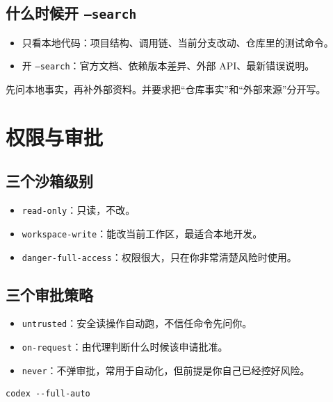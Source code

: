 \documentclass[UTF8,a4paper,11pt]{ctexart}
\begin{document}
\subsection{什么时候开 \texttt{--search}}

\begin{itemize}
  \item 只看本地代码：项目结构、调用链、当前分支改动、仓库里的测试命令。
  \item 开 \texttt{--search}：官方文档、依赖版本差异、外部 API、最新错误说明。
\end{itemize}

\begin{tipbox}
先问本地事实，再补外部资料。并要求把“仓库事实”和“外部来源”分开写。
\end{tipbox}

\section{权限与审批}

\subsection{三个沙箱级别}

\begin{itemize}
  \item \texttt{read-only}：只读，不改。
  \item \texttt{workspace-write}：能改当前工作区，最适合本地开发。
  \item \texttt{danger-full-access}：权限很大，只在你非常清楚风险时使用。
\end{itemize}

\subsection{三个审批策略}

\begin{itemize}
  \item \texttt{untrusted}：安全读操作自动跑，不信任命令先问你。
  \item \texttt{on-request}：由代理判断什么时候该申请批准。
  \item \texttt{never}：不弹审批，常用于自动化，但前提是你自己已经控好风险。
\end{itemize}

\begin{lstlisting}[style=cli]
codex --full-auto
\end{lstlisting}
\end{document}

